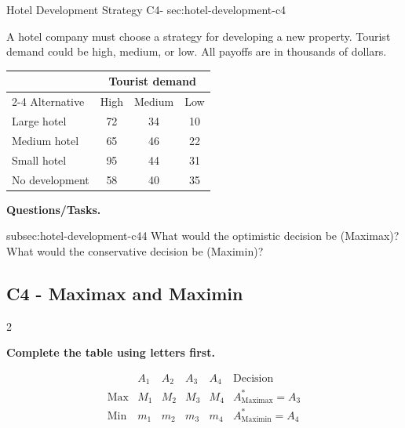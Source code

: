 	\sectionScored
	{Hotel Development Strategy}
	{C4-}
	{sec:hotel-development-c4}
	{
		A hotel company must choose a strategy for developing a new property.
		Tourist demand could be high, medium, or low. All payoffs are in
		thousands of dollars.
		
		\begin{center}
			\renewcommand{\arraystretch}{1.3}
			\small
			\begin{tabular}{lccc}
				\toprule
				& \multicolumn{3}{c}{Tourist demand} \\
				\cmidrule(lr){2-4}
				Alternative & High & Medium & Low \\
				\midrule
				Large hotel & 72 & 34 & 10 \\
				Medium hotel & 65 & 46 & 22 \\
				Small hotel & 95 & 44 & 31 \\
				No development & 58 & 40 & 35 \\
				\bottomrule
			\end{tabular}
		\end{center}
		\vspace{-5mm}
		
		\textbf{Questions/Tasks.}
		\begin{enumerate}
			\CriterionTask
			{subsec:hotel-development-c4}{4}
			{What would the optimistic decision be (Maximax)? What would the conservative decision be (Maximin)? }
		\end{enumerate}
		
		\label{subsec:hotel-development-c4}
		\subsection*{C4 - Maximax and Maximin }
		
		
		\begin{multicols}{2}
			
			\textbf{Complete the table using letters first.}
			
			\[
			\begin{array}{c|ccccc}
				& A_1 & A_2 & A_3 & A_4 & \text{Decision}\\
				\hline
				\text{Max} &
				M_1 & M_2 & M_3 & M_4 &
				A^*_{\mathrm{Maximax}}=A_3
				\\
				\text{Min} &
				m_1 & m_2 & m_3 & m_4 &
				A^*_{\mathrm{Maximin}}=A_4
			\end{array}
			\]
			

\end{multicols}}

